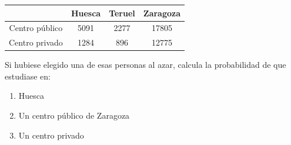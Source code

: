 \documentclass[fleqn]{article}
\begin{document}
\begin{enumerate}
\begin{tabular}{|c|c|c|c|}
\hline 
 & Huesca & Teruel & Zaragoza \\ 
\hline 
Centro público & 5091 & 2277 & 17805 \\ 
\hline 
Centro privado & 1284 & 896 & 12775 \\ 
\hline 
\end{tabular} 

Si hubiese elegido una de esas personas al azar, calcula la probabilidad de que estudiase en:
\begin{enumerate}
\item Huesca \noanswer
\item Un centro público de Zaragoza \noanswer
\item Un centro privado \noanswer
\end{enumerate}
 \end{enumerate}
\end{document}
